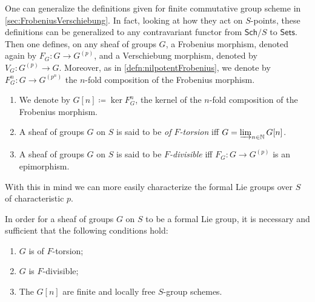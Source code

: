 \begin{rem}
One can generalize the definitions given for finite commutative group scheme
in \cref{sec:FrobeniusVerschiebung}.
In fact, looking at how they act on $S$-points, these
definitions can be generalized to any contravariant functor
from $\mathsf{Sch}/S$ to $\mathsf{Sets}$.
Then one defines, on any sheaf of groups $G$, a Frobenius morphism,
denoted again by $F_G\colon G \to G^{(p)}$, 
and a Verschiebung morphism, denoted by $V_G \colon G^{(p)} \to G$.
Moreover, as in \cref{defn:nilpotentFrobenius}, we denote by
$F^n_G\colon G \to G^{(p^n)}$ the $n$-fold composition
of the Frobenius morphism.
\end{rem}


\begin{defn}[]\leavevmode\vspace{-.2\baselineskip}
\begin{enumerate}
\item We denote by $G[n] \coloneqq \ker F^n_G$, the kernel of the $n$-fold composition
	of the Frobenius morphism.

\item A sheaf of groups $G$ on $S$ is said to be {\em of $F$-torsion} iff
	$G = \varinjlim_{n \in \mathbb{N}} G[n]$.

\item A sheaf of groups $G$ on $S$ is said to be {\em $F$-divisible} iff
	$F_G\colon G \to G^{(p)}$ is an epimorphism.
\end{enumerate}
\end{defn}


\noindent
With this in mind we can more easily characterize the formal Lie groups over
$S$ of characteristic $p$.
\begin{thm}\label{thm:MessingCharactLieGroup}
	In order for a sheaf of groups $G$ on $S$ to be a formal Lie group,
	it is necessary and sufficient that the following conditions hold:
\begin{enumerate}
	\item $G$ is of $F$-torsion;
	\item $G$ is $F$-divisible;
	\item The $G[n]$ are finite and locally free $S$-group schemes.
\end{enumerate}
\end{thm}


